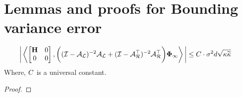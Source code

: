 \section{Lemmas and proofs for Bounding variance error}
\label{sec:varianceContraction}


\begin{lemma}
\label{lem:var1N2bound}
\iffalse
\begin{align*}
&\bigg\vert\iprod{\begin{bmatrix}\Cov&0\\0&0\end{bmatrix}}{ \bigg((\eyeT-\AL)^{-2}\AL+(\eyeT-\AR\T)^{-2}\AR\T\bigg)\phiv_{\infty}}\bigg\vert\\&\leq4\sigma^2 \cdot d \cdot\bigg(\ \frac{2}{\cfour}\cdot\bigg(1+\big(\frac{1+\sqrt{\cone\cfour}}{1-\cfour}\big)^2\bigg) + 3 \cdot \frac{1+\sqrt{\cone\cfour}}{1-\cfour} \cdot \frac{1+\sqrt{2}+\sqrt{\cfour/\cone}}{\cfour} \cdot (\sqrt{2}+\sqrt{\cfour/\cone}) \ \bigg)\sqrt{\cnH\cnS}
\end{align*}
\fi
\begin{align*}
&\bigg\vert\left\langle \begin{bmatrix}\mathbf{H}&0\\0&0\end{bmatrix},  \bigg((\mathcal{I}-\mathcal{A}_{\mathcal{L}})^{-2}\mathcal{A}_{\mathcal{L}}+(\mathcal{I}-\mathcal{A}_{\mathcal{R}}^{\top})^{-2}\mathcal{A}_{\mathcal{R}}^{\top}\bigg)\boldsymbol{\Phi}_{\infty} \right\rangle\bigg\vert\leq C\cdot\sigma^2 d\sqrt{{\kappa}\widetilde{\kappa}}
\end{align*}
Where, $C$ is a universal constant.
\end{lemma}
\begin{proof}

\end{proof}


